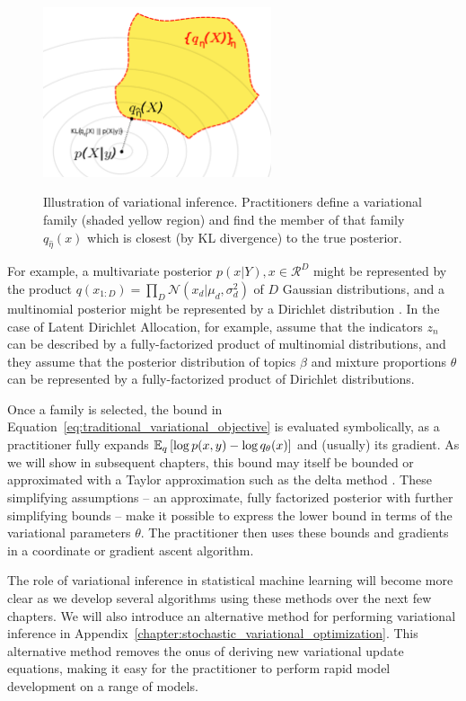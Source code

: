 \begin{figure}
  \center
  \includegraphics[width=0.6\textwidth]{chapter_introductory_material/figs/variational_family.pdf}
  \label{fig:variational_inference}
  \caption{Illustration of variational inference.  Practitioners
    define a variational family (shaded yellow region) and find the
    member of that family $q_{\hat \eta}(x)$ which is closest (by KL
    divergence) to the true posterior.}
\end{figure}
For example, a multivariate posterior $p(x | Y), x \in \mathcal{R}^D$
might be represented by the product $q(x_{1:D}) = \prod_D
\mathcal{N}(x_d | \mu_d, \sigma_d^2)$ of $D$ Gaussian distributions,
and a multinomial posterior might be represented by a Dirichlet
distribution \citep{bishop:2006}.  In the case of Latent Dirichlet
Allocation, for example, \cite{blei:2003} assume that the indicators
$z_n$ can be described by a fully-factorized product of multinomial
distributions, and they assume that the posterior distribution of
topics $\beta$ and mixture proportions $\theta$ can be represented by
a fully-factorized product of Dirichlet distributions.

Once a family is selected, the bound in
Equation~\ref{eq:traditional_variational_objective} is evaluated
symbolically, as a practitioner fully expands $\mathbb{E}_q\left[ \log p(x, y)
  - \log q_\theta(x)\right]$ and (usually) its gradient. As we will show in
subsequent chapters, this bound may itself be bounded or approximated
with a Taylor approximation such as the delta method
\citep{bickel:2007,braun:2007}. These simplifying assumptions -- an
approximate, fully factorized posterior with further simplifying
bounds -- make it possible to express the lower bound in terms of the
variational parameters $\theta$.  The practitioner then uses these
bounds and gradients in a coordinate or
gradient ascent algorithm.

The role of variational inference in statistical machine learning will
become more clear as we develop several algorithms using these methods
over the next few chapters.  We will also introduce an alternative
method for performing variational inference in
Appendix~\ref{chapter:stochastic_variational_optimization}.  This
alternative method removes the onus of deriving new variational update
equations, making it easy for the practitioner to perform rapid model
development on a range of models.


